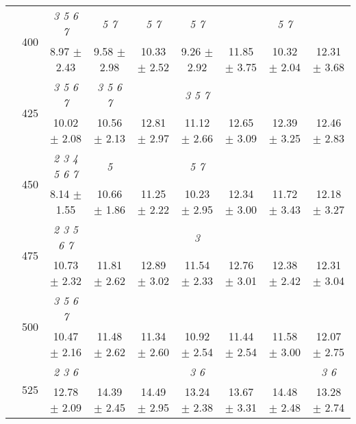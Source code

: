 \begin{table}[h]
{\begin{tabular}{
        ccccccccc}
 & \multirow{2}{*}{400}& \textit{ 3 5 6 7 }& \textit{ 5 7 }& \textit{ 5 7 }& \textit{ 5 7 }& & \textit{ 5 7 }&  \\ 
 & & 8.97 $\pm$ 2.43& 9.58 $\pm$ 2.98& 10.33 $\pm$ 2.52& 9.26 $\pm$ 2.92& 11.85 $\pm$ 3.75& 10.32 $\pm$ 2.04& 12.31 $\pm$ 3.68 \\ 
 & \multirow{2}{*}{425}& \cellcolor[HTML]{EFEFEF} \textit{ 3 5 6 7 }& \cellcolor[HTML]{EFEFEF} \textit{ 3 5 6 7 }& \cellcolor[HTML]{EFEFEF} & \cellcolor[HTML]{EFEFEF} \textit{ 3 5 7 }& \cellcolor[HTML]{EFEFEF} & \cellcolor[HTML]{EFEFEF} & \cellcolor[HTML]{EFEFEF}  \\ 
 & & \cellcolor[HTML]{EFEFEF} 10.02 $\pm$ 2.08& \cellcolor[HTML]{EFEFEF} 10.56 $\pm$ 2.13& \cellcolor[HTML]{EFEFEF} 12.81 $\pm$ 2.97& \cellcolor[HTML]{EFEFEF} 11.12 $\pm$ 2.66& \cellcolor[HTML]{EFEFEF} 12.65 $\pm$ 3.09& \cellcolor[HTML]{EFEFEF} 12.39 $\pm$ 3.25& \cellcolor[HTML]{EFEFEF} 12.46 $\pm$ 2.83 \\ 
 & \multirow{2}{*}{450}& \textit{ 2 3 4 5 6 7 }& \textit{ 5 }& & \textit{ 5 7 }& & &  \\ 
 & & 8.14 $\pm$ 1.55& 10.66 $\pm$ 1.86& 11.25 $\pm$ 2.22& 10.23 $\pm$ 2.95& 12.34 $\pm$ 3.00& 11.72 $\pm$ 3.43& 12.18 $\pm$ 3.27 \\ 
 & \multirow{2}{*}{475}& \cellcolor[HTML]{EFEFEF} \textit{ 2 3 5 6 7 }& \cellcolor[HTML]{EFEFEF} & \cellcolor[HTML]{EFEFEF} & \cellcolor[HTML]{EFEFEF} \textit{ 3 }& \cellcolor[HTML]{EFEFEF} & \cellcolor[HTML]{EFEFEF} & \cellcolor[HTML]{EFEFEF}  \\ 
 & & \cellcolor[HTML]{EFEFEF} 10.73 $\pm$ 2.32& \cellcolor[HTML]{EFEFEF} 11.81 $\pm$ 2.62& \cellcolor[HTML]{EFEFEF} 12.89 $\pm$ 3.02& \cellcolor[HTML]{EFEFEF} 11.54 $\pm$ 2.33& \cellcolor[HTML]{EFEFEF} 12.76 $\pm$ 3.01& \cellcolor[HTML]{EFEFEF} 12.38 $\pm$ 2.42& \cellcolor[HTML]{EFEFEF} 12.31 $\pm$ 3.04 \\ 
 & \multirow{2}{*}{500}& \textit{ 3 5 6 7 }& & & & & &  \\ 
 & & 10.47 $\pm$ 2.16& 11.48 $\pm$ 2.62& 11.34 $\pm$ 2.60& 10.92 $\pm$ 2.54& 11.44 $\pm$ 2.54& 11.58 $\pm$ 3.00& 12.07 $\pm$ 2.75 \\ 
 & \multirow{2}{*}{525}& \cellcolor[HTML]{EFEFEF} \textit{ 2 3 6 }& \cellcolor[HTML]{EFEFEF} & \cellcolor[HTML]{EFEFEF} & \cellcolor[HTML]{EFEFEF} \textit{ 3 6 }& \cellcolor[HTML]{EFEFEF} & \cellcolor[HTML]{EFEFEF} & \cellcolor[HTML]{EFEFEF} \textit{ 3 6 } \\ 
 & & \cellcolor[HTML]{EFEFEF} 12.78 $\pm$ 2.09& \cellcolor[HTML]{EFEFEF} 14.39 $\pm$ 2.45& \cellcolor[HTML]{EFEFEF} 14.49 $\pm$ 2.95& \cellcolor[HTML]{EFEFEF} 13.24 $\pm$ 2.38& \cellcolor[HTML]{EFEFEF} 13.67 $\pm$ 3.31& \cellcolor[HTML]{EFEFEF} 14.48 $\pm$ 2.48& \cellcolor[HTML]{EFEFEF} 13.28 $\pm$ 2.74 \\ 

\end{tabular}}
\end{table}
